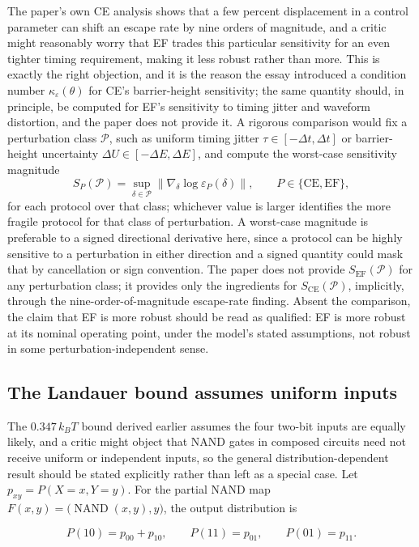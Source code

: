 \documentclass[11pt]{article}
\begin{document}
The paper's own CE analysis shows that a few percent displacement in a control parameter can shift an escape rate by nine orders of magnitude, and a critic might reasonably worry that EF trades this particular sensitivity for an even tighter timing requirement, making it less robust rather than more. This is exactly the right objection, and it is the reason the essay introduced a condition number $\kappa_\varepsilon(\theta)$ for CE's barrier-height sensitivity; the same quantity should, in principle, be computed for EF's sensitivity to timing jitter and waveform distortion, and the paper does not provide it. A rigorous comparison would fix a perturbation class $\mathcal P$, such as uniform timing jitter $\tau\in[-\Delta t,\Delta t]$ or barrier-height uncertainty $\Delta U\in[-\Delta E,\Delta E]$, and compute the worst-case sensitivity magnitude
\[
S_P(\mathcal P) = \sup_{\delta\in\mathcal P}\bigl\|\nabla_\delta\log\varepsilon_P(\delta)\bigr\|, \qquad P\in\{\mathrm{CE},\mathrm{EF}\},
\]
for each protocol over that class; whichever value is larger identifies the more fragile protocol for that class of perturbation. A worst-case magnitude is preferable to a signed directional derivative here, since a protocol can be highly sensitive to a perturbation in either direction and a signed quantity could mask that by cancellation or sign convention. The paper does not provide $S_{\mathrm{EF}}(\mathcal P)$ for any perturbation class; it provides only the ingredients for $S_{\mathrm{CE}}(\mathcal P)$, implicitly, through the nine-order-of-magnitude escape-rate finding. Absent the comparison, the claim that EF is more robust should be read as qualified: EF is more robust at its nominal operating point, under the model's stated assumptions, not robust in some perturbation-independent sense.

\subsection{The Landauer bound assumes uniform inputs}

The $0.347\,k_BT$ bound derived earlier assumes the four two-bit inputs are equally likely, and a critic might object that NAND gates in composed circuits need not receive uniform or independent inputs, so the general distribution-dependent result should be stated explicitly rather than left as a special case. Let $p_{xy}=P(X=x,Y=y)$. For the partial NAND map $F(x,y)=\bigl(\operatorname{NAND}(x,y),y\bigr)$, the output distribution is

\[
P(10)=p_{00}+p_{10}, \qquad P(11)=p_{01}, \qquad P(01)=p_{11}.
\]
\end{document}
